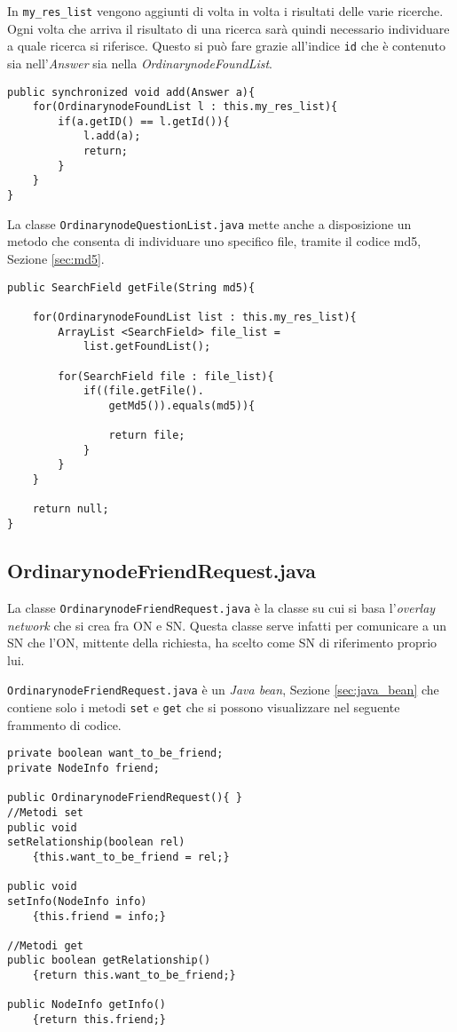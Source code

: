 In \verb|my_res_list| vengono aggiunti di volta in volta i risultati delle varie ricerche.
Ogni volta che arriva il risultato di una ricerca sarà quindi necessario individuare a quale ricerca si riferisce.
Questo si può fare grazie all'indice \verb|id| che è contenuto sia nell'\emph{Answer} sia nella \emph{OrdinarynodeFoundList}.
\begin{lstlisting}
public synchronized void add(Answer a){
	for(OrdinarynodeFoundList l : this.my_res_list){
		if(a.getID() == l.getId()){
			l.add(a);
			return;
		}
	}
}
\end{lstlisting}
La classe \verb|OrdinarynodeQuestionList.java| mette anche a disposizione un metodo che consenta di individuare uno specifico file, tramite il codice md5, Sezione \ref{sec:md5}.
\begin{lstlisting}
public SearchField getFile(String md5){

	for(OrdinarynodeFoundList list : this.my_res_list){
		ArrayList <SearchField> file_list = 
			list.getFoundList();

		for(SearchField file : file_list){
			if((file.getFile().
				getMd5()).equals(md5)){
				
				return file;
			}
		}
	}

	return null;
}

\end{lstlisting}

\subsection{OrdinarynodeFriendRequest.java}\label{sec:friend_request}
La classe \verb|OrdinarynodeFriendRequest.java| è la classe su cui si basa l'\emph{overlay network} che si crea fra ON e SN.
Questa classe serve infatti per comunicare a un SN che l'ON, mittente della richiesta, ha scelto come SN di riferimento proprio lui.

\verb|OrdinarynodeFriendRequest.java| è un \emph{Java bean}, Sezione \ref{sec:java_bean}
che contiene solo i metodi \verb|set| e \verb|get| che si possono visualizzare nel seguente frammento di codice.
\begin{lstlisting}
private boolean want_to_be_friend;
private NodeInfo friend;

public OrdinarynodeFriendRequest(){ }
//Metodi set
public void 
setRelationship(boolean rel)
	{this.want_to_be_friend = rel;}

public void 
setInfo(NodeInfo info)
	{this.friend = info;}

//Metodi get
public boolean getRelationship()
	{return this.want_to_be_friend;}

public NodeInfo getInfo()
	{return this.friend;}
\end{lstlisting}

